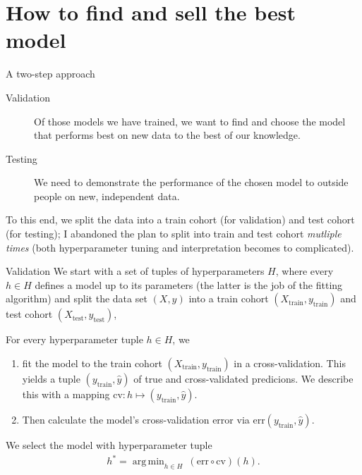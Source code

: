 \documentclass[10pt, aspectratio=169]{beamer}
\DeclareMathOperator*{\argmin}{arg\,min}
\begin{document}
\section{How to find and sell the best model}

\begin{frame}{A two-step approach}
  \begin{description}
    \item[Validation] Of those models we have trained, we want to find and choose
       the model that performs best on new data to the best of \alert{our} knowledge.
    \item[Testing] We need to demonstrate the performance of the chosen model to 
      \alert{outside} people on new, independent data.
  \end{description}

  To this end, we split the data into a train cohort (for validation) and test 
  cohort (for testing); I abandoned the plan to split into train and test cohort 
  \textit{mutliple times} (both hyperparameter tuning and interpretation becomes 
  to complicated).
\end{frame}

\begin{frame}{Validation}
  We start with a set of tuples of hyperparameters $H$, where every $h \in H$ 
  defines a model up to its parameters (the latter is the job of the fitting 
  algorithm) and split the data set $(X, y)$ into a train 
  cohort $(X_{\text{train}}, y_{\text{train}})$ and test cohort 
  $(X_{\text{test}}, y_{\text{test}})$,

  For every hyperparameter tuple $h \in H$, we

  \begin{enumerate}
    \item fit the model to the train cohort $(X_{\text{train}}, y_{\text{train}})$
    in a cross-validation. This yields a tuple $(y_{\text{train}}, \hat{y})$
    of true and cross-validated predicions. We describe this with a mapping 
    $\text{cv}: h \mapsto (y_{\text{train}}, \hat{y})$.
    \item Then calculate the model's cross-validation error via $\text{err}(
      y_{\text{train}}, \hat{y})$.
  \end{enumerate}

  We select the model with hyperparameter tuple
  \begin{align*}
    h^* = \argmin_{h \in H} \ (\text{err} \circ \text{cv})(h).
  \end{align*}
\end{frame}
\end{document}

